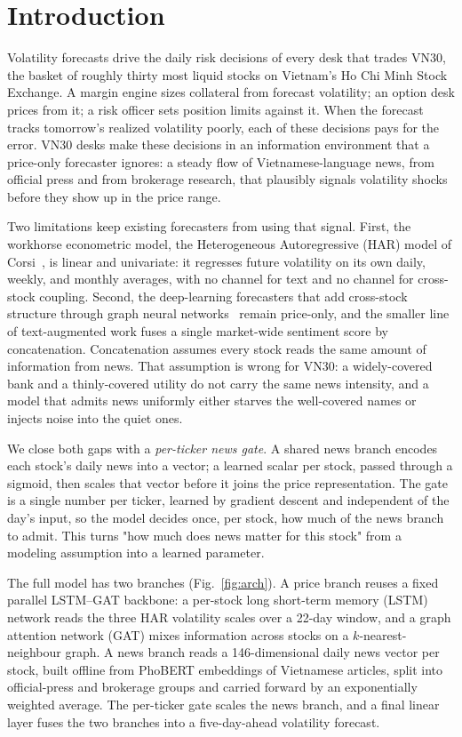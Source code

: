 \documentclass[runningheads]{llncs}
\begin{document}
\section{Introduction}
Volatility forecasts drive the daily risk decisions of every desk that trades VN30, the basket of
roughly thirty most liquid stocks on Vietnam's Ho Chi Minh Stock Exchange. A margin engine sizes
collateral from forecast volatility; an option desk prices from it; a risk officer sets position
limits against it. When the forecast tracks tomorrow's realized volatility poorly, each of these
decisions pays for the error. VN30 desks make these decisions in an information environment that a
price-only forecaster ignores: a steady flow of Vietnamese-language news, from official press and
from brokerage research, that plausibly signals volatility shocks before they show up in the price
range.

Two limitations keep existing forecasters from using that signal. First, the workhorse econometric
model, the Heterogeneous Autoregressive (HAR) model of Corsi~\cite{corsi2009}, is linear and
univariate: it regresses future volatility on its own daily, weekly, and monthly averages, with no
channel for text and no channel for cross-stock coupling. Second, the deep-learning forecasters
that add cross-stock structure through graph neural networks~\cite{velickovic2018,sonani2025}
remain price-only, and the smaller line of text-augmented work fuses a single market-wide sentiment
score by concatenation. Concatenation assumes every stock reads the same amount of information from
news. That assumption is wrong for VN30: a widely-covered bank and a thinly-covered utility do not
carry the same news intensity, and a model that admits news uniformly either starves the
well-covered names or injects noise into the quiet ones.

We close both gaps with a \emph{per-ticker news gate}. A shared news branch encodes each stock's
daily news into a vector; a learned scalar per stock, passed through a sigmoid, then scales that
vector before it joins the price representation. The gate is a single number per ticker, learned by
gradient descent and independent of the day's input, so the model decides once, per stock, how much
of the news branch to admit. This turns "how much does news matter for this stock" from a modeling
assumption into a learned parameter.

The full model has two branches (Fig.~\ref{fig:arch}). A price branch reuses a fixed parallel
LSTM--GAT backbone: a per-stock long short-term memory (LSTM) network reads the three HAR
volatility scales over a 22-day window, and a graph attention network (GAT) mixes information
across stocks on a $k$-nearest-neighbour graph. A
news branch reads a 146-dimensional daily news vector per stock, built offline from PhoBERT
embeddings of Vietnamese articles, split into official-press and brokerage groups and carried
forward by an exponentially weighted average. The per-ticker gate scales the news branch, and a
final linear layer fuses the two branches into a five-day-ahead volatility forecast.
\end{document}
